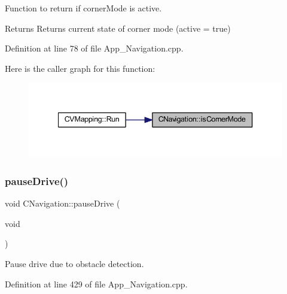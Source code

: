 Function to return if corner\+Mode is active. 

\begin{DoxyReturn}{Returns}
Returns current state of corner mode (active = true) 
\end{DoxyReturn}


Definition at line 78 of file App\+\_\+\+Navigation.\+cpp.

Here is the caller graph for this function\+:\nopagebreak
\begin{figure}[H]
\begin{center}
\leavevmode
\includegraphics[width=340pt]{class_c_navigation_aa984fc062deefed13a85d866d997de73_icgraph}
\end{center}
\end{figure}
\mbox{\label{class_c_navigation_a27649dc6324360829d42aea67e88e3ee}} 
\subsubsection{\texorpdfstring{pauseDrive()}{pauseDrive()}}
{\footnotesize\ttfamily void C\+Navigation\+::pause\+Drive (\begin{DoxyParamCaption}\item[{void}]{ }\end{DoxyParamCaption})\hspace{0.3cm}{\ttfamily [virtual]}}



Pause drive due to obstacle detection. 



Definition at line 429 of file App\+\_\+\+Navigation.\+cpp.

